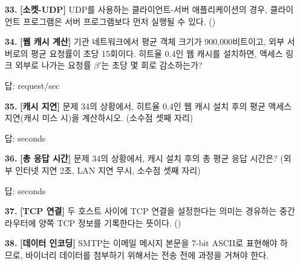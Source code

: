 \documentclass[a4paper, 10pt]{article}
\newcommand{\ansline}[1]{\underline{\hspace{#1}}}
\newcommand{\sectionbox}[1]{
  \vspace{0.5em}
  \noindent\fbox{\textbf{#1}}
  \vspace{0.5em}
}
\begin{document}
\begin{enumerate}[itemsep=3em, leftmargin=2em, label={}]
\item[\textbf{33.}] \textbf{[소켓-UDP]} UDP를 사용하는 클라이언트-서버 애플리케이션의 경우, 클라이언트 프로그램은 서버 프로그램보다 먼저 실행될 수 있다. (\hspace{1cm})



\item[\textbf{34.}] \textbf{[웹 캐시 계산]} 기관 네트워크에서 평균 객체 크기가 900,000비트이고, 외부 서버로의 평균 요청률이 초당 15회이다. 히트율 0.4인 웹 캐시를 설치하면, 액세스 링크 외부로 나가는 요청률 $\beta'$는 초당 몇 회로 감소하는가?



답: \ansline{3cm} request/sec



\item[\textbf{35.}] \textbf{[캐시 지연]} 문제 34의 상황에서, 히트율 0.4인 웹 캐시 설치 후의 평균 액세스 지연(캐시 미스 시)을 계산하시오. (소수점 셋째 자리)



답: \ansline{3cm} seconds



\item[\textbf{36.}] \textbf{[총 응답 시간]} 문제 34의 상황에서, 캐시 설치 후의 총 평균 응답 시간은? (외부 인터넷 지연 2초, LAN 지연 무시, 소수점 셋째 자리)



답: \ansline{3cm} seconds









\item[] \sectionbox{VI. 종합 및 비교}



\item[\textbf{37.}] \textbf{[TCP 연결]} 두 호스트 사이에 TCP 연결을 설정한다는 의미는 경유하는 중간 라우터에 양쪽 TCP 정보를 기록한다는 뜻이다. (\hspace{1cm})



\item[\textbf{38.}] \textbf{[데이터 인코딩]} SMTP는 이메일 메시지 본문을 7-bit ASCII로 표현해야 하므로, 바이너리 데이터를 첨부하기 위해서는 전송 전에 \ansline{4cm} 과정을 거쳐야 한다.




\end{enumerate}
\end{document}
